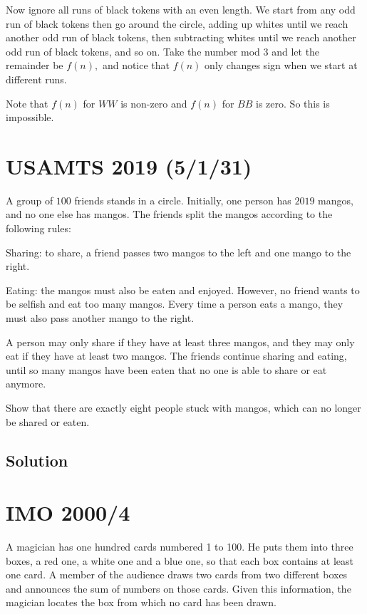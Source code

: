 \documentclass{article}
\begin{document}
Now ignore all runs of black tokens with an even length. We start from any odd run of black tokens then go around the circle, adding up whites until we reach another odd run of black tokens, then subtracting whites until we reach another odd run of black tokens, and so on. Take the number mod $3$ and let the remainder be $f(n),$ and notice that $f(n)$ only changes sign when we start at different runs.

Note that $f(n)$ for $WW$ is non-zero and $f(n)$ for $BB$ is zero. So this is impossible.

\pagebreak\section{USAMTS 2019 (5/1/31)}

A group of $100$ friends stands in a circle. Initially, one person has $2019$ mangos, and
no one else has mangos. The friends split the mangos according to the following rules:

\begin{itemize}
     \Item Sharing: to share, a friend passes two mangos to the left and one mango to the right.

     \Item Eating: the mangos must also be eaten and enjoyed. However, no friend wants to be
selfish and eat too many mangos. Every time a person eats a mango, they must also
pass another mango to the right.
\end{itemize}

A person may only share if they have at least three mangos, and they may only eat if they
have at least two mangos. The friends continue sharing and eating, until so many mangos
have been eaten that no one is able to share or eat anymore.

Show that there are exactly eight people stuck with mangos, which can no longer be shared or eaten.

\subsection{Solution}
 
\pagebreak\section{IMO 2000/4} 

A magician has one hundred cards numbered 1 to 100. He puts them into three boxes, a red one, a white one and a blue one, so that each box contains at least one card. A member of the audience draws two cards from two different boxes and announces the sum of numbers on those cards. Given this information, the magician locates the box from which no card has been drawn.
\end{document}
